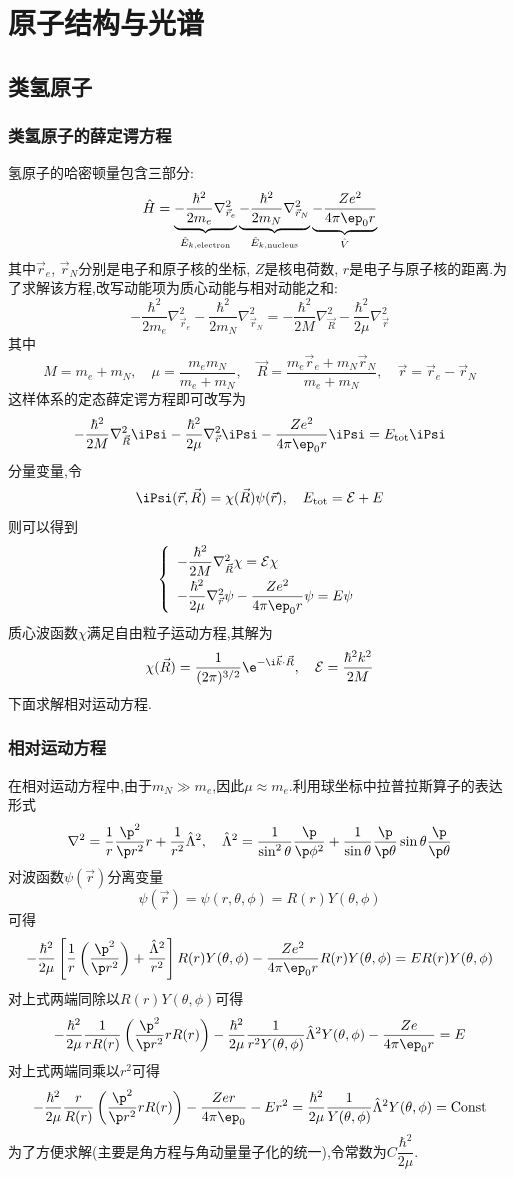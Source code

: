 \documentclass{ctexbook}
\begin{document}
\chapter{原子结构与光谱}
\section{类氢原子}
\subsection{类氢原子的薛定谔方程}
氢原子的哈密顿量包含三部分:
\[\hat{H}=\underbrace{-\dfrac{\hbar^2}{2m_e}\nabla_{\vec{r}_e}^2}_{\hat{E}_{k,\text{electron}}}\underbrace{-\dfrac{\hbar^2}{2m_N}\nabla_{\vec{r}_N}^2}_{\hat{E}_{k,\text{nucleus}}}\underbrace{-\dfrac{Ze^2}{4\pi\ep_0 r}}_{\hat{V}}\]
其中$\vec{r}_e$, $\vec{r}_N$分别是电子和原子核的坐标, $Z$是核电荷数, $r$是电子与原子核的距离.为了求解该方程,改写动能项为质心动能与相对动能之和:
\[-\dfrac{\hbar^2}{2m_e}\nabla_{\vec{r}_e}^2-\dfrac{\hbar^2}{2m_N}\nabla_{\vec{r}_N}^2=-\dfrac{\hbar^2}{2M}\nabla_{\vec{R}}^2-\dfrac{\hbar^2}{2\mu}\nabla_{\vec{r}}^2\]
其中
\[M=m_e+m_N,\quad\mu=\dfrac{m_em_N}{m_e+m_N},\quad\vec{R}=\dfrac{m_e\vec{r}_e+m_N\vec{r}_N}{m_e+m_N},\quad\vec{r}=\vec{r}_e-\vec{r}_N\]
这样体系的定态薛定谔方程即可改写为
\[-\dfrac{\hbar^2}{2M}\nabla_{\vec{R}}^2\iPsi-\dfrac{\hbar^2}{2\mu}\nabla_{\vec{r}}^2\iPsi-\dfrac{Ze^2}{4\pi\ep_0r}\iPsi=E_{\text{tot}}\iPsi\]
分量变量,令
\[\iPsi(\vec{r},\vec{R})=\chi(\vec{R})\psi(\vec{r}),\quad E_{\text{tot}}=\mathcal{E}+E\]
则可以得到
\[\left\{\begin{array}{l}
    -\dfrac{\hbar^2}{2M}\nabla_{\vec{R}}^2\chi=\mathcal{E}\chi\\[6pt]
    -\dfrac{\hbar^2}{2\mu}\nabla_{\vec{r}}^2\psi-\dfrac{Ze^2}{4\pi\ep_0 r}\psi=E\psi
\end{array}\right.\]
\indent 质心波函数$\chi$满足自由粒子运动方程,其解为
\[\chi(\vec{R})=\dfrac{1}{(2\pi)^{3/2}}\e^{-\i\vec{k}\cdot\vec{R}},\quad\mathcal{E}=\dfrac{\hbar^2k^2}{2M}\]
下面求解相对运动方程.
\subsection{相对运动方程}
在相对运动方程中,由于$m_N\gg m_e$,因此$\mu\approx m_e$.利用球坐标中拉普拉斯算子的表达形式
\[\nabla^2=\dfrac{1}{r}\dfrac{\p^2}{\p r^2}r+\dfrac{1}{r^2}\hat{\Lambda}^2,\quad\hat{\Lambda}^2=\dfrac{1}{\sin^2\theta}\dfrac{\p}{\p\phi^2}+\dfrac{1}{\sin\theta}\dfrac{\p}{\p\theta}\sin\theta\dfrac{\p}{\p\theta}\]
对波函数$\psi(\vec{r})$分离变量
\[\psi(\vec{r})=\psi(r,\theta,\phi)=R(r)Y(\theta,\phi)\]
可得
\[-\dfrac{\hbar^2}{2\mu}\left[\dfrac1r\left(\dfrac{\p^2}{\p r^2}\right)+\dfrac{\hat{\Lambda}^2}{r^2}\right]R(r)Y(\theta,\phi)-\dfrac{Ze^2}{4\pi\ep_0 r}R(r)Y(\theta,\phi)=ER(r)Y(\theta,\phi)\]
对上式两端同除以$R(r)Y(\theta,\phi)$可得
\[-\dfrac{\hbar^2}{2\mu}\dfrac{1}{rR(r)}\left(\dfrac{\p^2}{\p r^2}rR(r)\right)-\dfrac{\hbar^2}{2\mu}\dfrac{1}{r^2Y(\theta,\phi)}\hat{\Lambda}^2Y(\theta,\phi)-\dfrac{Ze}{4\pi\ep_0r}=E\]
对上式两端同乘以$r^2$可得
\[-\dfrac{\hbar^2}{2\mu}\dfrac{r}{R(r)}\left(\dfrac{\p^2}{\p r^2}rR(r)\right)-\dfrac{Zer}{4\pi\ep_0}-Er^2=\dfrac{\hbar^2}{2\mu}\dfrac{1}{Y(\theta,\phi)}\hat{\Lambda}^2Y(\theta,\phi)=\text{Const}\]
为了方便求解(主要是角方程与角动量量子化的统一),令常数为$C\dfrac{\hbar^2}{2\mu}$.
\end{document}
